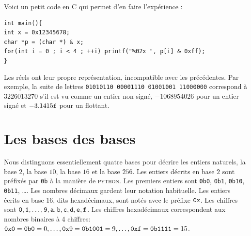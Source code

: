 \documentclass{book}
\newcommand{\python}{\textsc{python}\xspace}
\newcommand{\C}{\textsc{C}\xspace}
\newcommand{\hexa}[1]{{\tt 0x#1}}
\newcommand{\bina}[1]{{\tt 0b#1}}
\begin{document}
Voici un petit code en \C qui permet d'en faire l'expérience :
\begin{verbatim}
int main(){
int x = 0x12345678;
char *p = (char *) & x;
for(int i = 0 ; i < 4 ; ++i) printf("%02x ", p[i] & 0xff);
}
\end{verbatim}

Les réels ont leur propre représentation, incompatible avec les précédentes. Par exemple, la suite de lettres {\tt 01010110\ 00001110\ 01001001\ 11000000} correspond à  $3226013270$ s'il est vu comme un entier non signé, $-1068954026$ pour un entier signé et  $-3.1415{\tt f}$ pour un flottant. 


\section{Les bases des bases}

Nous distinguons essentiellement quatre bases pour décrire les entiers naturels, la base $2$, la base $10$, la base $16$ et la base $256$. Les entiers décrits en base $2$ sont préfixés par {\tt 0b} à la manière de \python. Les premiers entiers sont {\bina{0}, \bina{1}, \bina{10}, \bina{11}, \ldots}.  Les nombres décimaux gardent leur notation habituelle.  Les entiers écrits en base 16, dits hexadécimaux, sont notés avec le préfixe $\tt 0x$. Les chiffres sont $\tt 0, 1, \ldots, 9, a, b, c, d, e, f$. Les chiffres hexadécimaux correspondent aux nombres binaires à 4 chiffres: $\hexa{0} = \bina{0} = 0, \ldots, \hexa{9} = \bina{1001} = 9, \ldots, \hexa{f} = \bina{1111} = 15$. 
\end{document}
